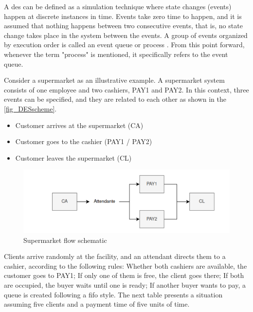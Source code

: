 A \gls{des} can be defined as a simulation technique where state changes (events) happen at discrete instances in time. Events take zero time 
to happen, and it is assumed that nothing happens between two consecutive events, that is, no state change takes place in the system between the 
events. A group of events organized by execution order is called an event queue or process \cite{DESVarga} \cite{SimulationBook}. From this point 
forward, whenever the term "process" is mentioned, it specifically refers to the event queue.

Consider a supermarket as an illustrative example. A supermarket system consists of one employee and two cashiers, PAY1 and PAY2. In this context, 
three events can be specified, and they are related to each other as shown in the \autoref{fig_DESscheme}.

\begin{itemize}
    \item Customer arrives at the supermarket (CA)
    \item Customer goes to the cashier (PAY1 / PAY2)
    \item Customer leaves the supermarket (CL)
\end{itemize}

\begin{figure}[H]
	\centering
 	\includegraphics[width=0.9\linewidth]{Images/DES_Scheme.png}
 	\caption{Supermarket flow schematic}
	 \label{fig_DESscheme}
\end{figure}

Clients arrive randomly at the facility, and an attendant directs them to a cashier, according to the following rules: Whether both cashiers 
are available, the customer goes to PAY1; If only one of them is free, the client goes there; If both are occupied, the buyer waits until one is 
ready; If another buyer wants to pay, a queue is created following a \gls{fifo} style. The next table presents a situation assuming five clients 
and a payment time of five units of time. 

